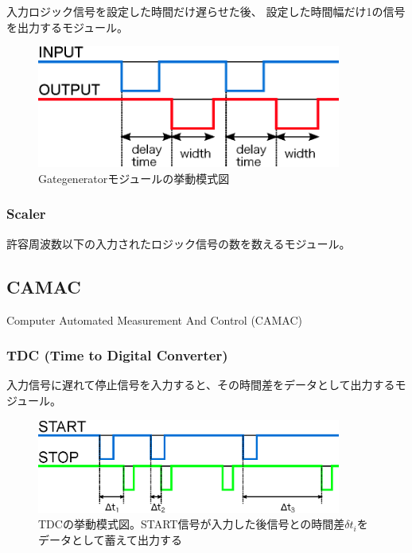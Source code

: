\documentclass{jarticle}
\begin{document}
	  入力ロジック信号を設定した時間だけ遅らせた後、
	  設定した時間幅だけ1の信号を出力するモジュール。
	  
	  \begin{figure}[H]
	   \begin{center}
	    \includegraphics[width = 100mm]{./picture/Gategenerator.eps}
	   \end{center}
	   \caption{Gategeneratorモジュールの挙動模式図}
	   \label{Fig:Gategenerator}
	  \end{figure}
	  
	  
   \subsubsection*{Scaler}
	  
	  許容周波数以下の入力されたロジック信号の数を数えるモジュール。
	  
	  
	  
	  

  \subsection{CAMAC}
  Computer Automated Measurement And Control (CAMAC)

  \subsubsection*{TDC (Time to Digital Converter)}

  入力信号に遅れて停止信号を入力すると、その時間差をデータとして出力するモジュール。

	  \begin{figure}[H]
	   \begin{center}
	    \includegraphics[width = 100mm]{./picture/TDC.eps}
	   \end{center}
	   \caption{TDCの挙動模式図。START信号が入力した後信号との時間差$\delta t_{i}$をデータとして蓄えて出力する}
	   \label{Fig:TDC}
	  \end{figure}
\end{document}
